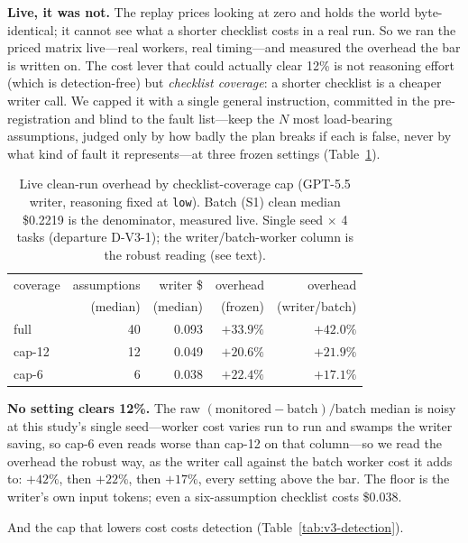 \documentclass[acmsmall,screen]{acmart}
\begin{document}
\textbf{Live, it was not.} The replay prices looking at zero and holds the world
byte-identical; it cannot see what a shorter checklist costs in a real run. So we
ran the priced matrix live---real workers, real timing---and measured the
overhead the bar is written on. The cost lever that could actually clear 12\% is
not reasoning effort (which is detection-free) but \emph{checklist coverage}: a
shorter checklist is a cheaper writer call. We capped it with a single general
instruction, committed in the pre-registration and blind to the fault list---keep
the $N$ most load-bearing assumptions, judged only by how badly the plan breaks
if each is false, never by what kind of fault it represents---at three frozen
settings (Table~\ref{tab:v3-overhead}).

\begin{table}[t]
\caption{Live clean-run overhead by checklist-coverage cap (GPT-5.5 writer,
reasoning fixed at \texttt{low}). Batch (S1) clean median \$0.2219 is the
denominator, measured live. Single seed $\times$ 4 tasks (departure D-V3-1); the
writer/batch-worker column is the robust reading (see text).}
\label{tab:v3-overhead}
\begin{tabular}{lrrrr}
\toprule
coverage & assumptions & writer \$ & overhead & overhead \\
 & (median) & (median) & (frozen) & (writer/batch) \\
\midrule
full   & 40 & 0.093 & $+33.9\%$ & $+42.0\%$ \\
cap-12 & 12 & 0.049 & $+20.6\%$ & $+21.9\%$ \\
cap-6  &  6 & 0.038 & $+22.4\%$ & $+17.1\%$ \\
\bottomrule
\end{tabular}
\end{table}

\textbf{No setting clears 12\%.} The raw
$(\mathrm{monitored}-\mathrm{batch})/\mathrm{batch}$ median is noisy at this
study's single seed---worker cost varies run to run and swamps the writer
saving, so cap-6 even reads worse than cap-12 on that column---so we read the
overhead the robust way, as the writer call against the batch worker cost it adds
to: $+42\%$, then $+22\%$, then $+17\%$, every setting above the bar. The floor is
the writer's own input tokens; even a six-assumption checklist costs \$0.038.

And the cap that lowers cost costs detection
(Table~\ref{tab:v3-detection}).
\end{document}
